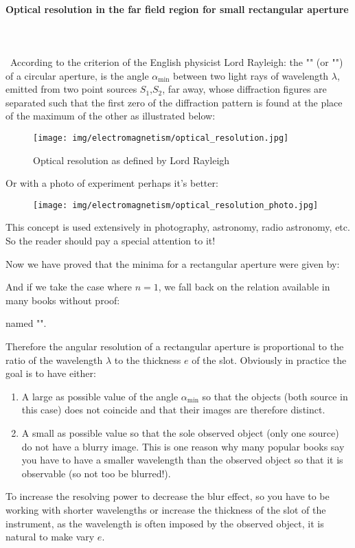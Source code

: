 	\paragraph{Optical resolution in the far field region for small rectangular aperture}\mbox{}\\\\\
	According to the criterion of the English physicist Lord Rayleigh: the "" (or "") of a circular aperture, is the angle $\alpha_{\min}$ between two light rays of wavelength $\lambda$, emitted from two point sources $S_1$,$S_2$, far away, whose diffraction figures are separated such that the first zero of the diffraction pattern is found at the place of the maximum of the other as illustrated below:
	\begin{figure}[H]
		\centering
		\texttt{[image: img/electromagnetism/optical\_resolution.jpg]}
		\caption{Optical resolution as defined by Lord Rayleigh}
	\end{figure}
	Or with a photo of experiment perhaps it's better:
	\begin{figure}[H]
		\centering
		\texttt{[image: img/electromagnetism/optical\_resolution\_photo.jpg]}
	\end{figure}
	This concept is used extensively in photography, astronomy, radio astronomy, etc. So the reader should pay a special attention to it!
	
	Now we have proved that the minima for a rectangular aperture were given by:
	
	And if we take the case where $n=1$, we fall back on the relation available in many books without proof:
	
	named "".
	
	Therefore the angular resolution of a rectangular aperture is proportional to the ratio of the wavelength $\lambda$ to the thickness $e$ of the slot. Obviously in practice the goal is to have either:
	
	\begin{enumerate}
		\item A large as possible value of the angle $\alpha_{\min}$ so that the objects (both source in this case) does not coincide and that their images are therefore distinct.

		\item A small as possible value  so that the sole observed object (only one source) do not have a blurry image. This is one reason why many popular books say you have to have a smaller wavelength than the observed object so that it is observable (so not too be blurred!).
	\end{enumerate}
	To increase the resolving power to decrease the blur effect, so you have to be working with shorter wavelengths or increase the thickness of the slot of the instrument, as the wavelength is often imposed by the observed object, it is natural to make vary $e$.
	
